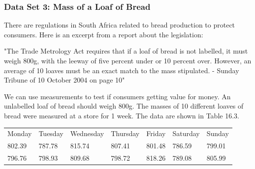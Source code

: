 \begin{description}[noitemsep]
\begin{description}[noitemsep]
            \subsubsection{ Data Set 3: Mass of a Loaf of Bread}
            \nopagebreak
        \label{m39403*id203270}There are regulations in South Africa related to bread production to protect consumers. Here is an excerpt from a report about the legislation:\par 
        \label{m39403*id203274}"The Trade Metrology Act requires that if a loaf of bread is not labelled, it must weigh 800g, with the leeway of five percent under or 10 percent over. However, an average of 10 loaves must be an exact match to the mass stipulated. - Sunday Tribune of 10 October 2004 on page 10"\par 
        \label{m39403*id203280}We can use measurements to test if consumers getting value for money. An unlabelled loaf of bread should weigh 800g. The masses of 10 different loaves of bread were measured at a store for 1 week. The data are shown in Table 16.3.\par 
          \begin{table}[H]
        \begin{center}
      \label{m39403*uid29}
    \noindent
      \tablelasttail{}
      \begin{xtabular}[t]{|l|l|l|l|l|l|l|}\hline
        Monday &
        Tuesday &
        Wednesday &
        Thursday &
        Friday &
        Saturday &
        Sunday%
     \tabularnewline{}
        802.39 &
        787.78 &
        815.74 &
        807.41 &
        801.48 &
        786.59 &
        799.01%
     \tabularnewline{}
        796.76 &
        798.93 &
        809.68 &
        798.72 &
        818.26 &
        789.08 &
        805.99%
     \tabularnewline{}

\end{xtabular}
\end{center}
\end{table}
\end{description}
\end{description}
